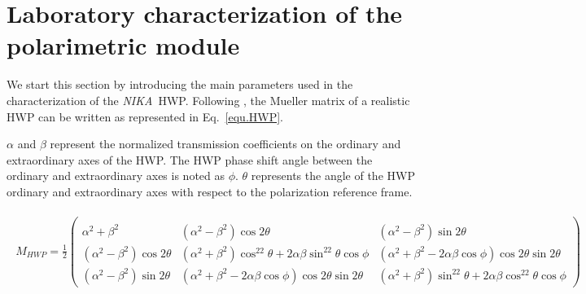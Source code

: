 \documentclass[twocolumn, traditabstract]{aa}
\newcommand{\nika}{{\it NIKA}}
\begin{document}
\section{Laboratory characterization of the polarimetric module}
\label{lab_characterization}
We start this section by introducing the main parameters used in the
characterization of the \nika\ HWP. Following \citet{savini2006}, the
Mueller matrix of a realistic HWP can be written as represented in Eq.~\ref{equ.HWP}.

\noindent $\alpha$ and $\beta$ represent the normalized
transmission coefficients on the ordinary and extraordinary axes of the HWP.
The HWP phase shift angle between the ordinary and extraordinary axes is noted
as $\phi$.  $\theta$ represents the angle of the HWP ordinary and extraordinary
axes with respect to the polarization reference frame.

 \begin{widetext}
 \begin{eqnarray} \label{equ.HWP}
   \begin{split}
      M_{HWP}=\frac{1}{2} \left(\begin{array}{lll} \\
        \alpha^2+\beta^2              & (\alpha^2-\beta^2)\cos2\theta & (\alpha^2-\beta^2)\sin2\theta \\
        (\alpha^2-\beta^2)\cos2\theta & (\alpha^2+\beta^2)\cos^22\theta +
        2\alpha\beta\sin^22\theta\cos\phi &
        (\alpha^2+\beta^2-2\alpha\beta\cos\phi)\cos2\theta\sin2\theta \\
        (\alpha^2-\beta^2)\sin2\theta &
        (\alpha^2+\beta^2-2\alpha\beta\cos\phi)\cos2\theta\sin2\theta &
        (\alpha^2+\beta^2)\sin^22\theta + 2\alpha\beta\cos^22\theta\cos\phi
      \end{array}\right)
   \end{split}
  \end{eqnarray}
\end{widetext}
\end{document}
